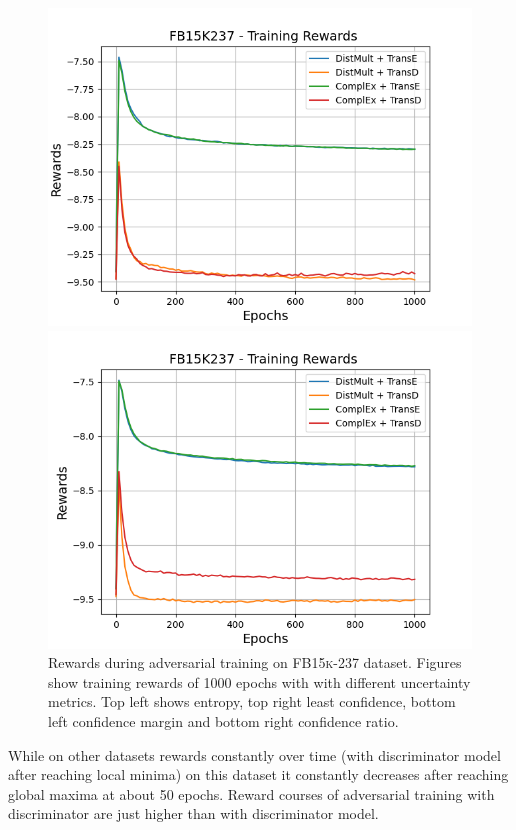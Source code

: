 \begin{figure}[H]
\begin{minipage}{.5\textwidth}
      \centering
      \includegraphics[width=0.9\linewidth]{figures/results/gan_train/not_pretrained/uncertainty/max_distribution/confidence_margin/fb15k237/uncertainty_fb15k237_rew.png}
    \end{minipage}%
    \begin{minipage}{.5\textwidth}
      \centering
      \includegraphics[width=0.9\linewidth]{figures/results/gan_train/not_pretrained/uncertainty/max_distribution/confidence_ratio/fb15k237/uncertainty_fb15k237_rew.png}
    \end{minipage}%
    \caption{Rewards during adversarial training on \textsc{FB15k-237} dataset. 
    Figures show training rewards of 1000 epochs with \ussoftmax with different uncertainty metrics.
    Top left shows entropy, top right least confidence, 
    bottom left confidence margin and bottom right confidence ratio.}
    \label{fig:advtrain_metrics_fb15k237_rew}
\end{figure}
While on other datasets rewards constantly over time (with \transd discriminator model after reaching local minima) on this dataset it constantly decreases after reaching global maxima at about 50 epochs.
Reward courses of adversarial training with \transe discriminator are just higher than with \transd discriminator model.

